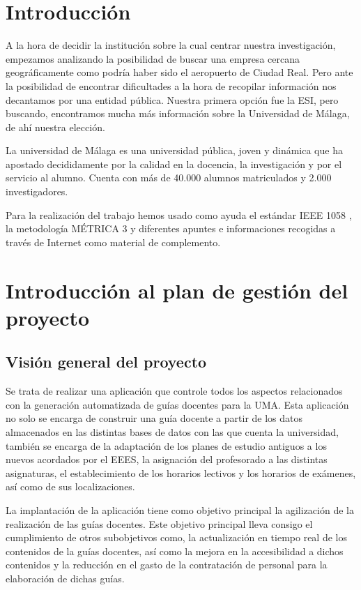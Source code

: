 \documentclass[11pt,a4paper,spanish,twoside]{report}
\begin{document}
\tableofcontents

\chapter*{Introducción}
A la hora de decidir la institución sobre la cual centrar nuestra 
investigación, empezamos analizando la posibilidad de buscar una empresa 
cercana geográficamente como podría haber sido el aeropuerto de Ciudad Real. 
Pero ante la posibilidad de encontrar dificultades a la hora de recopilar 
información nos decantamos por una entidad pública. Nuestra primera opción fue 
la ESI, pero buscando, encontramos mucha más información sobre la Universidad 
de Málaga, de ahí nuestra elección.

La universidad de Málaga es una universidad pública, joven y dinámica que ha 
apostado decididamente por la calidad en la docencia, la investigación y por el
servicio al alumno. Cuenta con más de 40.000 alumnos matriculados y 2.000 
investigadores. 

Para la realización del trabajo hemos usado como ayuda el estándar IEEE
1058 \cite{ieee}, la metodología MÉTRICA 3 \cite{met} y diferentes apuntes e
informaciones recogidas a través de Internet como material de complemento. 

\chapter{Introducción al plan de gestión del proyecto}
\section{Visión general del proyecto}
Se trata de realizar una aplicación que controle todos los aspectos 
relacionados con la generación automatizada de guías docentes para la UMA.
Esta aplicación no solo se encarga de construir una guía docente a partir de 
los datos almacenados en las distintas bases de datos con las que cuenta la 
universidad, también se encarga de la adaptación de los planes de estudio 
antiguos a los nuevos acordados por el EEES, la asignación del profesorado a 
las distintas asignaturas, el establecimiento de los horarios lectivos y los 
horarios de exámenes, así como de sus localizaciones.

La implantación de la aplicación tiene como objetivo principal la agilización 
de la realización de las guías docentes. Este objetivo principal lleva 
consigo el cumplimiento de otros subobjetivos como, la actualización en tiempo 
real de los contenidos de la guías docentes, así como la mejora en la 
accesibilidad a dichos contenidos y la reducción en el gasto de la 
contratación de personal para la elaboración de dichas guías.
\end{document}

